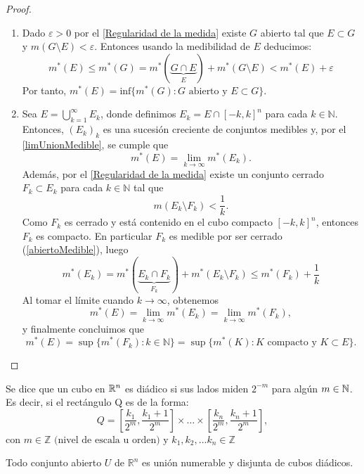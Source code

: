 \begin{proof}
    \leavevmode
    \begin{enumerate}
        \item Dado $\varepsilon > 0$ por el \cref{Regularidad de la medida} existe $G$
              abierto tal que $E \subset G$ y $m(G \setminus E) < \varepsilon$. Entonces usando la medibilidad de $E$ deducimos:
              $$m^*(E) \leq m^*(G) = m^*(\underbrace{G \cap E}_{E}) + m^*(G \setminus E) < m^*(E) + \varepsilon$$
              Por tanto,
              $m^*(E) = \text{inf}\{m^*(G) : G \text{ abierto y } E \subset G\}$.
        \item Sea \(E = \bigcup_{k=1}^\infty E_k\), donde definimos \(E_k = E \cap [-k, k]^n\) para cada \(k \in \mathbb{N}\). Entonces, \((E_k)_k\) es una sucesión creciente de conjuntos medibles y, por el \cref{limUnionMedible}, se cumple que
        \[
        m^*(E) = \lim_{k \to \infty} m^*(E_k).
        \]
        Además, por el \cref{Regularidad de la medida} existe un conjunto cerrado \(F_k \subset E_k\) para cada \(k \in \mathbb{N}\) tal que
        \[
        m(E_k \setminus F_k) < \frac{1}{k}.
        \]
        Como \(F_k\) es cerrado y está contenido en el cubo compacto \([-k,k]^n\), entonces \(F_k\) es compacto. En particular $F_k$ es medible por ser cerrado (\cref{abiertoMedible}), luego 
        \[
        m^*(E_k) = m^*(\underbrace{E_k \cap F_k}_{F_k}) + m^*(E_k \setminus F_k) \leq m^*(F_k) + \frac{1}{k}
        \]
        Al tomar el límite cuando \(k \to \infty\), obtenemos
        \[
        m^*(E) = \lim_{k \to \infty} m^*(E_k) = \lim_{k \to \infty} m^*(F_k),
        \]
        y finalmente concluimos que
        \[
        m^*(E) = \sup\{ m^*(F_k) : k \in \mathbb{N} \} = \sup \{ m^*(K) : K \text{ compacto y } K \subset E \}.
        \]        
    \end{enumerate}
\end{proof}

\begin{definición}
Se dice que un cubo en $\mathbb{R}^n$ es diádico si sus lados miden $2^{-m}$ para algún $m \in \mathbb{N}$.
Es decir, si el rectángulo Q es de la forma:
\[Q = \left[\frac{k_1}{2^m}, \frac{k_1 + 1}{2^m}\right] \times \dots \times \left[\frac{k_n}{2^m}, \frac{k_n + 1}{2^m}\right],\]
con $m \in \mathbb{Z} \text{ (nivel de escala u orden) y } k_1, k_2, \dots k_n
    \in \mathbb{Z}$
\end{definición}

\begin{teorema}
    Todo conjunto abierto $U$ de $\mathbb{R}^n$ es unión numerable y disjunta de cubos diádicos.
\end{teorema}


